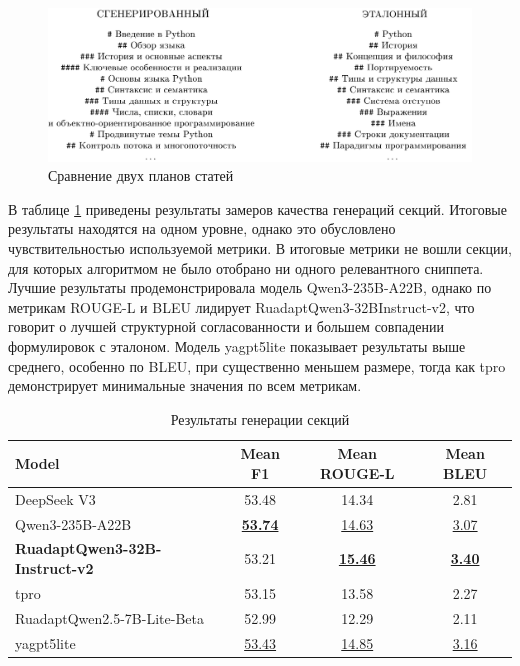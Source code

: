 \documentclass{article}
\begin{document}
\begin{figure}[ht!]
  \centering
  \includegraphics[width=\textwidth]{figures/outline.png}
  \caption{Сравнение двух планов статей}
  \label{fig:outline}
\end{figure}

В таблице \ref{tab:secs} приведены результаты замеров качества генераций секций. Итоговые результаты находятся на одном уровне, однако это обусловлено чувствительностью используемой метрики.
В итоговые метрики не вошли секции, для которых алгоритмом не было отобрано ни одного релевантного сниппета. Лучшие результаты 
продемонстрировала модель Qwen3-\allowbreak 235B-\allowbreak A22B, однако по метрикам ROUGE-\allowbreak L и BLEU лидирует RuadaptQwen3-\allowbreak 32BInstruct-v2, что говорит о лучшей структурной согласованности и 
большем совпадении формулировок с эталоном.
Модель yagpt5lite показывает результаты выше среднего, особенно по BLEU, при существенно меньшем размере, тогда как tpro демонстрирует минимальные значения по всем метрикам.

\begin{table}[ht!]
\centering
\caption{Результаты генерации секций}
\begin{tabular}{l|c|c|c}
\hline
\textbf{Model} & \textbf{Mean F1} & \textbf{Mean ROUGE-L} & \textbf{Mean BLEU} \\
\hline
DeepSeek V3                                                               & 53.48 & 14.34 & 2.81 \\
Qwen3-\allowbreak 235B-\allowbreak A22B                                   & \uline{\textbf{53.74}} & \uline{14.63} & \uline{3.07} \\
\hline
\textbf{RuadaptQwen3-\allowbreak 32B-\allowbreak Instruct-\allowbreak v2} & 53.21 & \uline{\textbf{15.46}} & \uline{\textbf{3.40}} \\
tpro                                                                      & 53.15 & 13.58 & 2.27 \\
\hline
RuadaptQwen2.5-7B-\allowbreak Lite-\allowbreak Beta                       & 52.99 & 12.29 & 2.11 \\
yagpt5lite                                                                & \uline{53.43} & \uline{14.85} & \uline{3.16} \\
\hline
\end{tabular}
\label{tab:secs}
\end{table}
\end{document}
